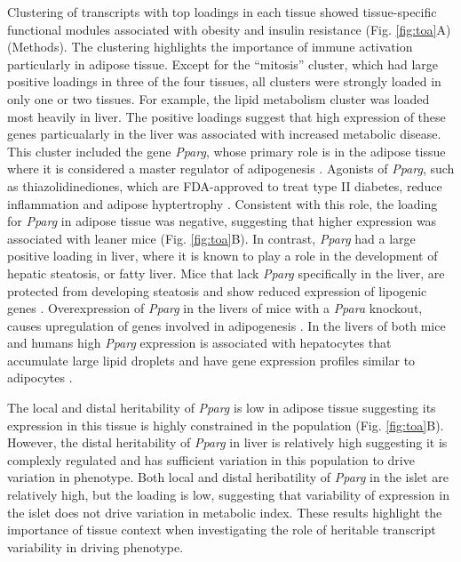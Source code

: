 \documentclass[
]{article}
\begin{document}
Clustering of transcripts with top loadings in each tissue showed
tissue-specific functional modules associated with obesity and insulin
resistance (Fig. \ref{fig:toa}A) (Methods). The clustering highlights
the importance of immune activation particularly in adipose tissue.
Except for the ``mitosis'' cluster, which had large positive loadings in
three of the four tissues, all clusters were strongly loaded in only one
or two tissues. For example, the lipid metabolism cluster was loaded
most heavily in liver. The positive loadings suggest that high
expression of these genes particualarly in the liver was associated with
increased metabolic disease. This cluster included the gene
\textit{Pparg}, whose primary role is in the adipose tissue where it is
considered a master regulator of adipogenesis \cite{pmid17389767}.
Agonists of \textit{Pparg}, such as thiazolidinediones, which are
FDA-approved to treat type II diabetes, reduce inflammation and adipose
hyptertrophy \cite{pmid17389767}. Consistent with this role, the loading
for \textit{Pparg} in adipose tissue was negative, suggesting that
higher expression was associated with leaner mice (Fig. \ref{fig:toa}B).
In contrast, \textit{Pparg} had a large positive loading in liver, where
it is known to play a role in the development of hepatic steatosis, or
fatty liver. Mice that lack \textit{Pparg} specifically in the liver,
are protected from developing steatosis and show reduced expression of
lipogenic genes \cite{pmid12805374, pmid12618528}. Overexpression of
\textit{Pparg} in the livers of mice with a \textit{Ppara} knockout,
causes upregulation of genes involved in adipogenesis
\cite{pmid16357043}. In the livers of both mice and humans high
\textit{Pparg} expression is associated with hepatocytes that accumulate
large lipid droplets and have gene expression profiles similar to
adipocytes \cite{pmid15644454, pmid16403437}.

The local and distal heritability of \textit{Pparg} is low in adipose
tissue suggesting its expression in this tissue is highly constrained in
the population (Fig. \ref{fig:toa}B). However, the distal heritability
of \textit{Pparg} in liver is relatively high suggesting it is complexly
regulated and has sufficient variation in this population to drive
variation in phenotype. Both local and distal heribatility of
\textit{Pparg} in the islet are relatively high, but the loading is low,
suggesting that variability of expression in the islet does not drive
variation in metabolic index. These results highlight the importance of
tissue context when investigating the role of heritable transcript
variability in driving phenotype.
\end{document}
